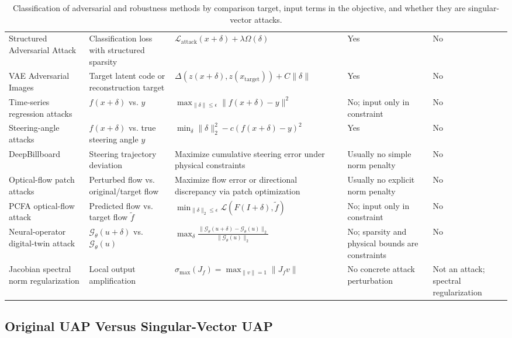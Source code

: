 \documentclass{article}
\begin{document}
\begin{table}[h]
\begin{tabular}{p{3.2cm} p{3.4cm} p{4.8cm} p{2.2cm} p{2.0cm}}
Structured Adversarial Attack
&
Classification loss with structured sparsity
&
\(\mathcal{L}_{\mathrm{attack}}(x+\delta)+\lambda\Omega(\delta)\)
&
Yes
&
No
\\

VAE Adversarial Images
&
Target latent code or reconstruction target
&
\(\Delta(z(x+\delta),z(x_{\mathrm{target}}))+C\|\delta\|\)
&
Yes
&
No
\\

Time-series regression attacks
&
\(f(x+\delta)\) vs. \(y\)
&
\(\max_{\|\delta\|\le \epsilon}\|f(x+\delta)-y\|^2\)
&
No; input only in constraint
&
No
\\

Steering-angle attacks
&
\(f(x+\delta)\) vs. true steering angle \(y\)
&
\(\min_\delta \|\delta\|_2^2-c(f(x+\delta)-y)^2\)
&
Yes
&
No
\\

DeepBillboard
&
Steering trajectory deviation
&
Maximize cumulative steering error under physical constraints
&
Usually no simple norm penalty
&
No
\\

Optical-flow patch attacks
&
Perturbed flow vs. original/target flow
&
Maximize flow error or directional discrepancy via patch optimization
&
Usually no explicit norm penalty
&
No
\\

PCFA optical-flow attack
&
Predicted flow vs. target flow \(\tilde f\)
&
\(\min_{\|\delta\|_2\le \epsilon}\mathcal{L}(F(I+\delta),\tilde f)\)
&
No; input only in constraint
&
No
\\

Neural-operator digital-twin attack
&
\(\mathcal{G}_\theta(u+\delta)\) vs. \(\mathcal{G}_\theta(u)\)
&
\(\max_\delta \frac{\|\mathcal{G}_\theta(u+\delta)-\mathcal{G}_\theta(u)\|_2}{\|\mathcal{G}_\theta(u)\|_2}\)
&
No; sparsity and physical bounds are constraints
&
No
\\

Jacobian spectral norm regularization
&
Local output amplification
&
\(\sigma_{\max}(J_f)=\max_{\|v\|=1}\|J_fv\|\)
&
No concrete attack perturbation
&
Not an attack; spectral regularization
\\
\hline
\end{tabular}
\caption{Classification of adversarial and robustness methods by comparison target, input terms in the objective, and whether they are singular-vector attacks.}
\end{table}

\subsection{Original UAP Versus Singular-Vector UAP}
\end{document}
